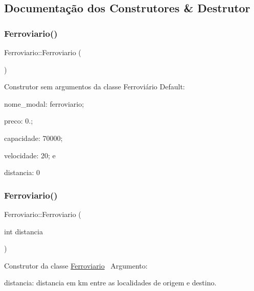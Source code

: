 \subsection{Documentação dos Construtores \& Destrutor}
\mbox{\label{classFerroviario_ad9ab87f65b1e904a3fec909076f0a993}} 
\subsubsection{\texorpdfstring{Ferroviario()}{Ferroviario()}\hspace{0.1cm}{\footnotesize\ttfamily [1/2]}}
{\footnotesize\ttfamily Ferroviario\+::\+Ferroviario (\begin{DoxyParamCaption}{ }\end{DoxyParamCaption})}

Construtor sem argumentos da classe Ferroviário Default\+:
\begin{DoxyItemize}
\item nome\+\_\+modal\+: ferroviario;
\item preco\+: 0.;
\item capacidade\+: 70000;
\item velocidade\+: 20; e
\item distancia\+: 0~\newline

\end{DoxyItemize}\mbox{\label{classFerroviario_a497cd242a790babb459821c59ff3678c}} 
\subsubsection{\texorpdfstring{Ferroviario()}{Ferroviario()}\hspace{0.1cm}{\footnotesize\ttfamily [2/2]}}
{\footnotesize\ttfamily Ferroviario\+::\+Ferroviario (\begin{DoxyParamCaption}\item[{int}]{distancia }\end{DoxyParamCaption})}

Construtor da classe \hyperlink{classFerroviario}{Ferroviario}~\newline
 Argumento\+:
\begin{DoxyItemize}
\item distancia\+: distancia em km entre as localidades de origem e destino.
\end{DoxyItemize}\mbox{\label{classFerroviario_a14356b699e7cd2651654ef06029d2f0d}} 
